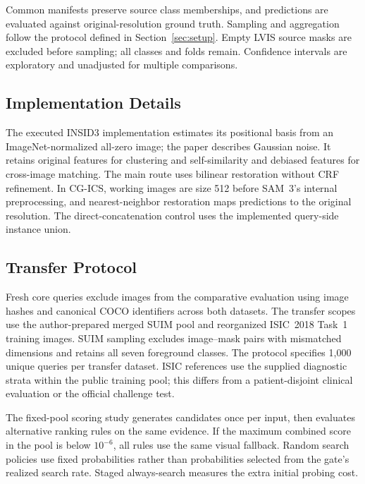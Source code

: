 Common manifests preserve source class memberships, and predictions are evaluated against original-resolution ground truth. Sampling and aggregation follow the protocol defined in Section~\ref{sec:setup}. Empty LVIS source masks are excluded before sampling; all classes and folds remain. Confidence intervals are exploratory and unadjusted for multiple comparisons.

\subsection{Implementation Details}
The executed INSID3 implementation estimates its positional basis from an ImageNet-normalized all-zero image; the paper describes Gaussian noise. It retains original features for clustering and self-similarity and debiased features for cross-image matching. The main route uses bilinear restoration without CRF refinement. In CG-ICS, working images are size 512 before SAM~3's internal preprocessing, and nearest-neighbor restoration maps predictions to the original resolution. The direct-concatenation control uses the implemented query-side instance union. 

\subsection{Transfer Protocol}
Fresh core queries exclude images from the comparative evaluation using image hashes and canonical COCO identifiers across both datasets. The transfer scopes use the author-prepared merged SUIM pool and reorganized ISIC~2018 Task~1 training images. SUIM sampling excludes image--mask pairs with mismatched dimensions and retains all seven foreground classes. The protocol specifies 1,000 unique queries per transfer dataset. ISIC references use the supplied diagnostic strata within the public training pool; this differs from a patient-disjoint clinical evaluation or the official challenge test.

The fixed-pool scoring study generates candidates once per input, then evaluates alternative ranking rules on the same evidence. If the maximum combined score in the pool is below $10^{-6}$, all rules use the same visual fallback. Random search policies use fixed probabilities rather than probabilities selected from the gate's realized search rate. Staged always-search measures the extra initial probing cost. 



